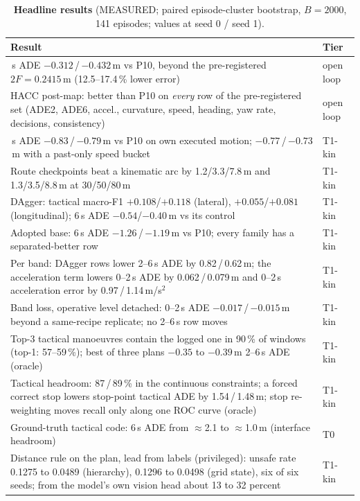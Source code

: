 \documentclass[10pt,twocolumn]{article}
\theoremstyle{remark}
\begin{document}
\begin{table}[!t]
\centering
\caption{\textbf{Headline results} (MEASURED; paired episode-cluster bootstrap, $B=2000$, 141 episodes; values at seed 0 / seed 1).}
\label{tab:headline}
\small
\begin{tabularx}{\columnwidth}{@{}>{\raggedright\arraybackslash}Xl@{}}
\toprule
Result & Tier \\
\midrule
6\,s ADE $-0.312$\,/\,$-0.432$\,m vs P10, beyond the pre-registered $2F=0.2415$\,m (12.5--17.4\,\% lower error) & open loop \\
HACC post-map: better than P10 on \emph{every} row of the pre-registered set (ADE2, ADE6, accel., curvature, speed, heading, yaw rate, decisions, consistency) & open loop \\
6\,s ADE $-0.83$\,/\,$-0.79$\,m vs P10 on own executed motion; $-0.77$\,/\,$-0.73$\,m with a past-only speed bucket & T1-kin \\
Route checkpoints beat a kinematic arc by 1.2/3.3/7.8\,m and 1.3/3.5/8.8\,m at 30/50/80\,m & T1-kin \\
DAgger: tactical macro-F1 $+0.108$/$+0.118$ (lateral), $+0.055$/$+0.081$ (longitudinal); 6\,s ADE $-0.54$/$-0.40$\,m vs its control & T1-kin \\
Adopted base: 6\,s ADE $-1.26$\,/\,$-1.19$\,m vs P10; every family has a separated-better row & T1-kin \\
Per band: DAgger rows lower 2--6\,s ADE by 0.82\,/\,0.62\,m; the acceleration term lowers 0--2\,s ADE by 0.062\,/\,0.079\,m and 0--2\,s acceleration error by 0.97\,/\,1.14\,m/s$^2$ & T1-kin \\
Band loss, operative level detached: 0--2\,s ADE $-0.017$\,/\,$-0.015$\,m beyond a same-recipe replicate; no 2--6\,s row moves & T1-kin \\
Top-3 tactical manoeuvres contain the logged one in 90\,\% of windows (top-1: 57--59\,\%); best of three plans $-0.35$ to $-0.39$\,m 2--6\,s ADE (oracle) & T1-kin \\
Tactical headroom: 87\,/\,89\,\% in the continuous constraints; a forced correct stop lowers stop-point tactical ADE by 1.54\,/\,1.48\,m; stop re-weighting moves recall only along one ROC curve (oracle) & T1-kin \\
Ground-truth tactical code: 6\,s ADE from $\approx$2.1 to $\approx$1.0\,m (interface headroom) & T0 \\
Distance rule on the plan, lead from labels (privileged): unsafe rate 0.1275 to 0.0489 (hierarchy), 0.1296 to 0.0498 (grid state), six of six seeds; from the model's own vision head about 13 to 32 percent & T1-kin \\

\end{tabularx}
\end{table}
\end{document}
